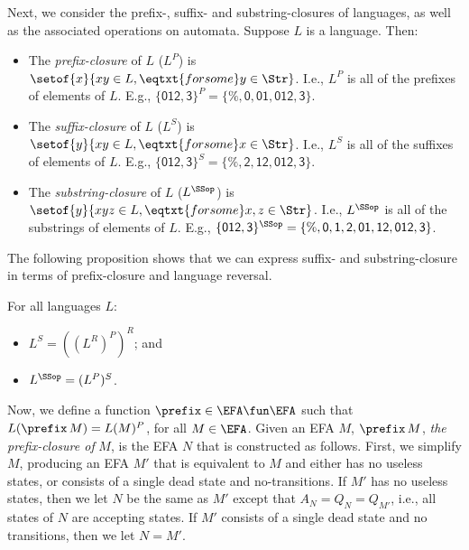 Next, we consider the prefix-, suffix- and substring-closures of
%
%
%
%
%
%
languages, as well as the associated operations on automata.  Suppose
$L$ is a language.  Then:
\begin{itemize}
\item The \emph{prefix-closure} of $L$ ($L^P$) is $\setof{x}{xy\in L,
\eqtxt{for some}y\in\Str}$.  I.e., $L^P$ is all of the prefixes
of elements of $L$.  E.g., $\{\mathsf{012,3}\}^P =
\{\mathsf{\%,0,01,012,3}\}$.

\item The \emph{suffix-closure} of $L$ ($L^S$) is $\setof{y}{xy\in L,
\eqtxt{for some}x\in\Str}$.  I.e., $L^S$ is all of the suffixes
of elements of $L$.  E.g., $\{\mathsf{012,3}\}^S =
\{\mathsf{\%,2,12,012,3}\}$.

\item The \emph{substring-closure} of $L$ ($L^\SSop$) is $\setof{y}{xyz\in L,
\eqtxt{for some}x,z\in\Str}$.  I.e., $L^\SSop$ is all of the substrings
of elements of $L$.  E.g., $\{\mathsf{012,3}\}^\SSop =
\{\mathsf{\%, 0, 1, 2, 01, 12, 012, 3}\}$.
\end{itemize}

The following proposition shows that we can express suffix- and
substring-closure in terms of prefix-closure and language reversal.

\begin{proposition}
\label{PrefixSuffixSubstringClosure}
For all languages $L$:
\begin{itemize}
\item $L^S = ((L^R)^P)^R$; and

\item $L^\SSop = (L^P)^S$.
\end{itemize}
\end{proposition}

Now, we define a function $\prefix\in\EFA\fun\EFA$ such that
%
%
%
%
$L(\prefix\,M)=L(M)^P$, for all $M\in\EFA$.  Given an EFA $M$,
$\prefix\,M$, \emph{the prefix-closure of} $M$,
is the EFA $N$ that is constructed as follows.
First, we simplify $M$, producing an EFA $M'$ that is equivalent to
$M$ and either has no useless states, or consists of a single dead
state and no-transitions.
If $M'$ has no useless states, then we let $N$ be the same as $M'$
except that $A_N = Q_N=Q_{M'}$,
i.e., all states of $N$ are accepting states.
If $M'$ consists of a single dead state and no transitions,
then we let $N=M'$.

